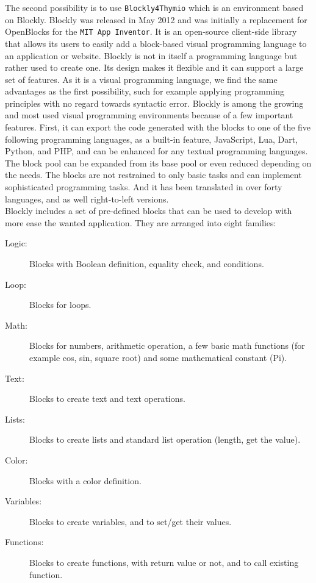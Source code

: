 \documentclass{scrbook}
\begin{document}
The second possibility is to use \texttt{Blockly4Thymio} which is an environment based on Blockly. Blockly was released in May 2012 and was initially a replacement for OpenBlocks for the \texttt{MIT App Inventor}. 
It is an open-source client-side library that allows its users to easily add a block-based visual programming language to an application or website. 
Blockly is not in itself a programming language but rather used to create one. Its design makes it flexible and it can support a large set of features. 
As it is a visual programming language, we find the same advantages as the first possibility, such for example applying programming principles with no regard towards syntactic error.
Blockly is among the growing and most used visual programming environments because of a few important features. First, it can export the code generated with the blocks to one of the five following programming languages, 
as a built-in feature, JavaScript, Lua, Dart, Python, and PHP, and can be enhanced for any textual programming languages. 
The block pool can be expanded from its base pool or even reduced depending on the needs. The blocks are not restrained to only basic tasks and can implement sophisticated programming tasks. 
And it has been translated in over forty languages, and as well right-to-left versions. \\

Blockly includes a set of pre-defined blocks that can be used to develop with more ease the wanted application. They are arranged into eight families:
\begin{description}
  \item [Logic:] Blocks with Boolean definition, equality check, and conditions.
  \item [Loop:] Blocks for loops.
  \item [Math:] Blocks for numbers, arithmetic operation, a few basic math functions (for example cos, sin, square root) and some mathematical constant (Pi).
  \item [Text:] Blocks to create text and text operations.
  \item [Lists:] Blocks to create lists and standard list operation (length, get the value).
  \item [Color:] Blocks with a color definition.
  \item [Variables:] Blocks to create variables, and to set/get their values.
  \item [Functions:] Blocks to create functions, with return value or not, and to call existing function.
\end{description}
\end{document}
